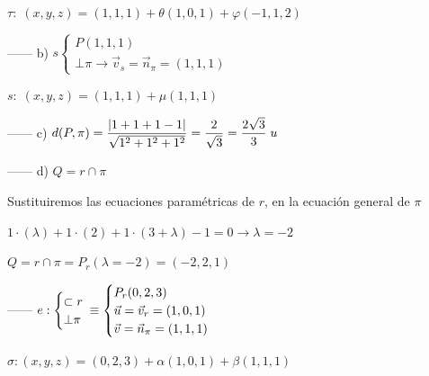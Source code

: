 \begin{proofw}
\noindent $\tau:\; (x,y,z)=(1,1,1)+\theta (1,0,1)+\varphi (-1,1,2)$

\noindent ------ b) $s\begin{cases} P(1,1,1) \\ \bot \pi \to \vec v_s=\vec n_{\pi}=(1,1,1) \end{cases}$

\noindent $s:\; (x,y,z)=(1,1,1)+\mu (1,1,1)$

\noindent ------ c) $d(P,\pi	)=\dfrac {\abs{1+1+1-1}}{\sqrt{1^2+1^2+1^2}}=\dfrac 2 {\sqrt{3}}=\dfrac {2\sqrt{3}}{3}\; u$

\noindent ------ d) $Q=r\cap \pi$

\noindent Sustituiremos las ecuaciones paramétricas de $r$, en la ecuación general de $\pi$

\noindent $1\cdot (\lambda)+1\cdot (2)+1\cdot (3+\lambda)-1=0 \to \lambda=-2$

\noindent $Q=r\cap \pi =P_r(\lambda=-2)=(-2,2,1)$

\noindent ------ $e:\begin{cases} \subset r \\ \bot \pi \end{cases} \hspace{-3mm} \equiv \begin{cases} P_r(0,2,3) \\ \vec u=\vec v_r=(1,0,1) \\ \vec v=\vec n_{\pi}=(1,1,1) \end{cases}$

\noindent $\sigma: (x,y,z)=(0,2,3)+ \alpha (1,0,1) + \beta (1,1,1)$

\end{proofw}


